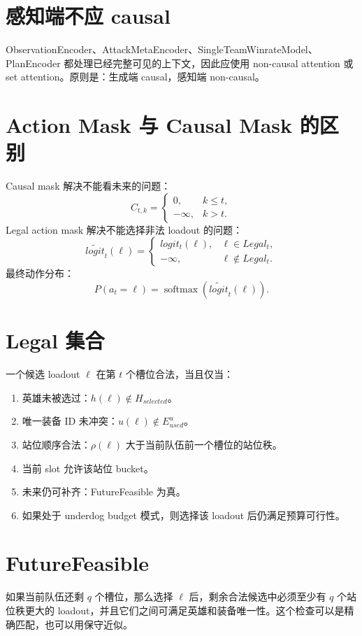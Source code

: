 \documentclass[UTF8,12pt,openany]{ctexbook}
\newcommand{\softmax}{\operatorname{softmax}}
\begin{document}
\section{感知端不应 causal}
ObservationEncoder、AttackMetaEncoder、SingleTeamWinrateModel、PlanEncoder 都处理已经完整可见的上下文，因此应使用 non-causal attention 或 set attention。原则是：生成端 causal，感知端 non-causal。

\section{Action Mask 与 Causal Mask 的区别}
Causal mask 解决不能看未来的问题：
\begin{equation}
C_{t,k}=\begin{cases}0,&k\le t,\\-\infty,&k>t.\end{cases}
\end{equation}
Legal action mask 解决不能选择非法 loadout 的问题：
\begin{equation}
\tilde{logit}_t(\ell)=\begin{cases}logit_t(\ell),&\ell\in Legal_t,\\-\infty,&\ell\notin Legal_t.\end{cases}
\end{equation}
最终动作分布：
\begin{equation}
P(a_t=\ell)=\softmax(\tilde{logit}_t(\ell)).
\end{equation}

\section{Legal 集合}
一个候选 loadout $\ell$ 在第 $t$ 个槽位合法，当且仅当：
\begin{enumerate}[leftmargin=2em]
\item 英雄未被选过：$h(\ell)\notin H_{selected}$。
\item 唯一装备 ID 未冲突：$u(\ell)\notin E^u_{used}$。
\item 站位顺序合法：$\rho(\ell)$ 大于当前队伍前一个槽位的站位秩。
\item 当前 slot 允许该站位 bucket。
\item 未来仍可补齐：FutureFeasible 为真。
\item 如果处于 underdog budget 模式，则选择该 loadout 后仍满足预算可行性。
\end{enumerate}

\section{FutureFeasible}
如果当前队伍还剩 $q$ 个槽位，那么选择 $\ell$ 后，剩余合法候选中必须至少有 $q$ 个站位秩更大的 loadout，并且它们之间可满足英雄和装备唯一性。这个检查可以是精确匹配，也可以用保守近似。
\end{document}
